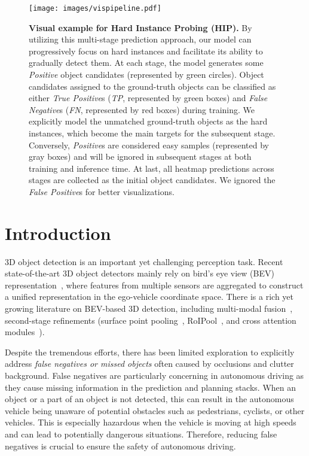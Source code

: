\documentclass[10pt,twocolumn,letterpaper]{article}
\begin{document}
\begin{figure}[t!]
	\begin{center}
		\texttt{[image: images/vispipeline.pdf]}
	\end{center}
	\caption{\textbf{Visual example for Hard Instance Probing (HIP).} By utilizing this multi-stage prediction approach, our model can progressively focus on hard instances and facilitate its ability to gradually detect them. At each stage, the model generates some \textit{Positive} object candidates (represented by green circles). Object candidates assigned to the ground-truth objects can be classified as either \textit{True Positive}s (\textit{TP}, represented by  \textcolor[rgb]{0.41,0.55,0.13}{green boxes}) and \textit{False Negative}s (\textit{FN}, represented by {\color{red} red boxes}) during training. We explicitly model the unmatched ground-truth objects as the hard instances, which become the main targets for the subsequent stage. Conversely, \textit{Positive}s are considered easy samples (represented by {\color{gray} gray boxes}) and will be ignored in subsequent stages at both training and inference time. At last, all heatmap predictions across stages are collected as the initial object candidates. We ignored the \textit{False Positive}s for better visualizations.}\label{fig:visualize pipeline}\vspace{-2mm}
\end{figure}

\section{Introduction}
3D object detection is an important yet challenging perception task. Recent state-of-the-art 3D object detectors mainly rely on bird's eye view (BEV) representation~\cite{VoxelNet, pointpillar, centerpoint}, where features from multiple sensors are aggregated to construct a unified representation in the ego-vehicle coordinate space. There is a rich yet growing literature on BEV-based 3D detection, including multi-modal fusion~\cite{transfusion, bevfusion, bevfusionmit, li2022uvtr, li2022vff, jiao2022msmdfusion, deepinteraction}, second-stage refinements (surface point pooling~\cite{centerpoint}, RoIPool~\cite{pointrcnn, fastpointrcnn, voxelrcnn, lidarrcnn}, and cross attention modules~\cite{transfusion, groupfree}). 


Despite the tremendous efforts, there has been limited exploration to explicitly address {\em false negatives or missed objects} often caused by occlusions and clutter background. False negatives are particularly concerning in autonomous driving as they cause missing information in the prediction and planning stacks.
When an object or a part of an object is not detected, this can result in the autonomous vehicle being unaware of potential obstacles such as pedestrians, cyclists, or other vehicles. This is especially hazardous when the vehicle is moving at high speeds and can lead to potentially dangerous situations. Therefore, reducing false negatives is crucial to ensure the safety of autonomous driving.
\end{document}
